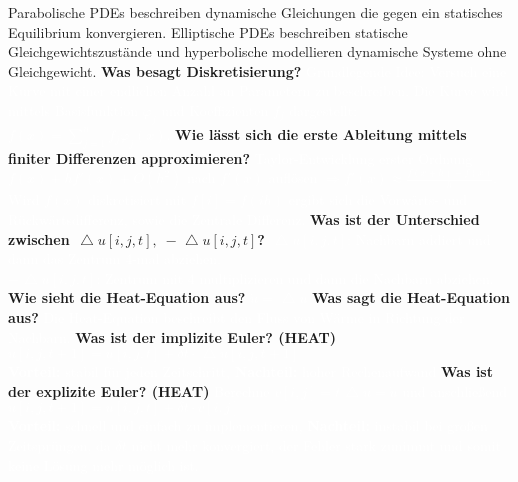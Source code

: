 \documentclass{beamer}
\begin{document}
{{{		Parabolische PDEs beschreiben dynamische Gleichungen die gegen ein statisches Equilibrium konvergieren. Elliptische PDEs beschreiben statische Gleichgewichtszustände und hyperbolische modellieren dynamische Systeme ohne Gleichgewicht.
} }
{\textbf{ Was besagt Diskretisierung?\newline} \textcolor<1>{white}{
		Grundlegende Idee: Versuch eine Kurve mit einer endlichen Anzahl an Parametern zu beschreiben.
		Die Kurve wird mittels Basisfunktion $\varphi_j$ und Koeffizienten $f_j$ dargestellt: $\displaystyle f(x)=\sum_{j=1}^n f_j\varphi_j(x)$. 
} }
{\textbf{ Wie lässt sich die erste Ableitung mittels finiter Differenzen approximieren?\newline} \textcolor<1>{white}{
		Taylor-Entwicklung erster Ordnung $f(x)+hf'(x)+O(h^2)$ nach $f'(x)$ auflösen $\Rightarrow f'(x)\approx\frac{f(x+h)-f(x)}{h}$. Wird $f(x)$ diskretisiert mit $f[i]=f(ih)$ ergibt sich die Vorwärts- und Rückwärtsdifferenz, sowie die Zentrale Differenz.
} }
{\textbf{ Was ist der Unterschied zwischen $\mathop{\!\mathbin\bigtriangleup} u[i,j,t],\;-\mathop{\!\mathbin\bigtriangleup} u[i,j,t]$?\newline} \textcolor<1>{white}{
		$\mathop{\!\mathbin\bigtriangleup} u[i,j,t]$: Nachbarn addiert und dann das Zentrum 4-mal abziehen.\\
		$-\mathop{\!\mathbin\bigtriangleup} u[i,j,t]$: Zentrum mit 4 multiplizieren und dann die Nachbarn abziehen.
} }
{\textbf{Wie sieht die Heat-Equation aus?\newline} \textcolor<1>{white}{
		$\dot{u}=\mathop{\!\mathbin\bigtriangleup}u$
} }
{\textbf{Was sagt die Heat-Equation aus?\newline} \textcolor<1>{white}{
		Die Heat-Equation beschreibt den Fluss von Wärme in Richtung der Nachbarn.
} }
{\textbf{Was ist der implizite Euler? (HEAT)\newline} \textcolor<1>{white}{
		$u[i,j,t+1]=u[i,j,t]+\delta t \cdot\mathop{\!\mathbin\bigtriangleup}u[i,j,t+1]$\\
		\textbf{Vorteil:} stabil für jeden Zeitschritt, \textbf{Nachteil:} hoher Rechenaufwand
} }
{\textbf{Was ist der explizite Euler? (HEAT)\newline} \textcolor<1>{white}{
		Berechne $v[i,j]=t\mathop{\!\mathbin\bigtriangleup}u=\dot{u}$ und anschließend $u[i,j,t+1]=u[i,j,t]+\delta t\cdot v[i,j]$\\
		\textbf{Vorteil:} schnell und einfach zu implementieren, \textbf{Nachteil:} instabil bei großen Zeitsprüngen, da $\delta t$ nicht mehr konvergiert, der Fehler stark zunimmt und somit keine Lösung mehr möglich ist.
}}}
\end{document}
